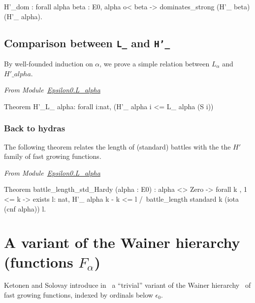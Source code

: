 \noindent
\begin{Coqsrc}
  H'_dom : forall alpha beta : E0, alpha o< beta ->
  dominates_strong (H'_ beta) (H'_ alpha).
\end{Coqsrc}


\subsection{Comparison between \texttt{L\_} and \texttt{H'\_} }

By well-founded induction on $\alpha$, we prove a simple relation between $L_\alpha$ and $H'\_alpha$.

\emph{From Module~\href{../theories/html/hydras.Epsilon0.L_alpha.html\#H'_L_}{Epsilon0.L\_alpha}}

\begin{Coqsrc}
 Theorem H'_L_ alpha: forall i:nat,  (H'_ alpha i <= L_ alpha (S i))%
\end{Coqsrc}
 
\subsubsection{Back to hydras}

The following theorem relates the length of (standard) battles with the the $H'$ family of fast growing functions.

\vspace{4pt}

\noindent
\emph{From Module~\href{../theories/html/hydras.Epsilon0.L_alpha.html}{Epsilon0.L\_alpha}}

\begin{Coqsrc}
Theorem battle_length_std_Hardy (alpha : E0) :
  alpha <> Zero ->
  forall k , 1 <= k -> exists l: nat,  
       H'_ alpha k - k <= l /\
       battle_length standard k (iota (cnf alpha)) l.    
\end{Coqsrc}



\section{A variant of the Wainer hierarchy (functions \texorpdfstring{$F_\alpha$}{F\_alpha})}
\label{sect:wainer}


Ketonen and Solovay introduce in~\cite{KS81} a ``trivial'' variant of the Wainer hierarchy~\cite{BW85, Wainer1970} of fast growing functions, indexed by ordinals below $\epsilon_0$.

